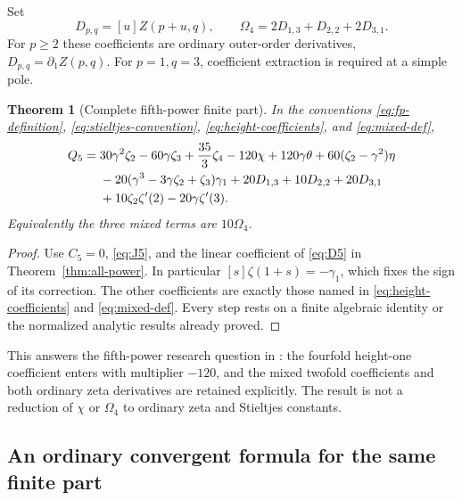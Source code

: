 \documentclass[11pt,a4paper]{article}
\numberwithin{equation}{section}
\newtheorem{theorem}{Theorem}[section]
\theoremstyle{definition}
\theoremstyle{remark}
\begin{document}
Set
\begin{equation}
 D_{p,q}=[u]Z(p+u,q),\qquad
 \Omega_4=2D_{1,3}+D_{2,2}+2D_{3,1}.
 \label{eq:mixed-def}
\end{equation}
For $p\ge2$ these coefficients are ordinary outer-order derivatives,
$D_{p,q}=\partial_1Z(p,q)$.  For $p=1,q=3$, coefficient extraction
is required at a simple pole.

\begin{theorem}[Complete fifth-power finite part]
\label{thm:q5}
In the conventions \eqref{eq:fp-definition},
\eqref{eq:stieltjes-convention}, \eqref{eq:height-coefficients}, and
\eqref{eq:mixed-def},
\begin{align}
 Q_5={}&30\gamma^2\zeta_2-60\gamma\zeta_3+\frac{35}{3}\zeta_4
          -120\chi+120\gamma\theta
          +60(\zeta_2-\gamma^2)\eta
 \notag\\
 &-20(\gamma^3-3\gamma\zeta_2+\zeta_3)\gamma_1
          +20D_{1,3}+10D_{2,2}+20D_{3,1}
 \notag\\
 &+10\zeta_2\zeta'(2)-20\gamma\zeta'(3).
 \label{eq:Q5}
\end{align}
Equivalently the three mixed terms are $10\Omega_4$.
\end{theorem}

\begin{proof}
Use $C_5=0$, \eqref{eq:J5}, and the linear coefficient of
\eqref{eq:D5} in Theorem~\ref{thm:all-power}.  In particular
$[s]\zeta(1+s)=-\gamma_1$, which fixes the sign of its correction.
The other coefficients are exactly those named in
\eqref{eq:height-coefficients} and \eqref{eq:mixed-def}.
Every step rests on a finite algebraic identity or the normalized
analytic results already proved.
\end{proof}

This answers the fifth-power research question in \cite{Quartic}:
the fourfold height-one coefficient enters with multiplier $-120$,
and the mixed twofold coefficients and both ordinary zeta derivatives
are retained explicitly.  The result is not a reduction of $\chi$
or $\Omega_4$ to ordinary zeta and Stieltjes constants.

\subsection{An ordinary convergent formula for the same finite part}
\end{document}
